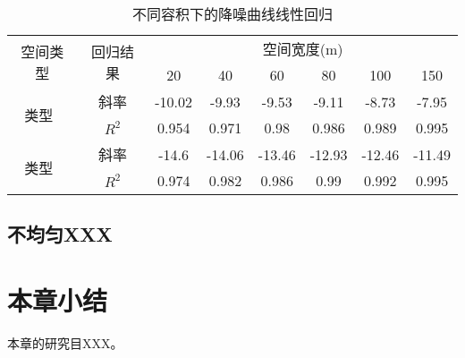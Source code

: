 \begin{table}[!htb]
\centering
\caption{不同容积下的降噪曲线线性回归}
\label{tab:chapt_3_regression_noise_reduction}
\vspace{0.5em}\centering\wuhao
\begin{tabular}{cccccccc}
\toprule[1.5pt]
\multirow{2}{*}{空间类型}                                               & \multirow{2}{*}{回归结果} & \multicolumn{6}{c}{空间宽度(m)}                         \\
                                                                    &                                   & 20     & 40     & 60     & 80     & 100    & 150    \\ \midrule[1pt]
\multirow{2}{*}{类型~\uppercase\expandafter{\romannumeral1}} & 斜率                             & -10.02 & -9.93  & -9.53  & -9.11  & -8.73  & -7.95  \\
                                                                    & $R^2$                                & 0.954  & 0.971  & 0.98   & 0.986  & 0.989  & 0.995  \\
\multirow{2}{*}{类型~\uppercase\expandafter{\romannumeral2}} & 斜率                             & -14.6  & -14.06 & -13.46 & -12.93 & -12.46 & -11.49 \\
                                                                    & $R^2$                                & 0.974  & 0.982  & 0.986  & 0.99   & 0.992  & 0.995  \\
\bottomrule[1.5pt]
\end{tabular}
\vspace{\baselineskip}
\end{table}

\subsection{不均匀XXX}


\FloatBarrier
\section{本章小结}
本章的研究目XXX。
